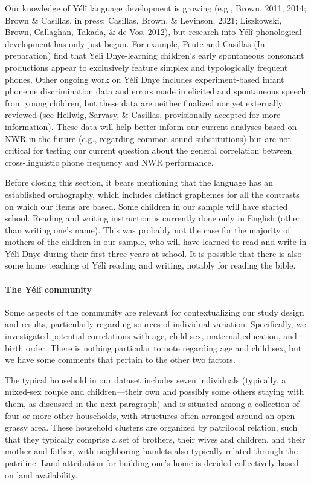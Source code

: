 \documentclass[
  american,
  ,man,floatsintext]{apa6}
\let\oldparagraph\paragraph
\renewcommand{\paragraph}[1]{\oldparagraph{#1}\mbox{}}
\begin{document}
Our knowledge of Yélî language development is growing (e.g., Brown, 2011, 2014; Brown \& Casillas, in press; Casillas, Brown, \& Levinson, 2021; Liszkowski, Brown, Callaghan, Takada, \& de Vos, 2012), but research into Yélî phonological development has only just begun. For example, Peute and Casillas (In preparation) find that Yélî Dnye-learning children's early spontaneous consonant productions appear to exclusively feature simplex and typologically frequent phones. Other ongoing work on Yélî Dnye includes experiment-based infant phoneme discrimination data and errors made in elicited and spontaneous speech from young children, but these data are neither finalized nor yet externally reviewed (see Hellwig, Sarvasy, \& Casillas, provisionally accepted for more information). These data will help better inform our current analyses based on NWR in the future (e.g., regarding common sound substitutions) but are not critical for testing our current question about the general correlation between cross-linguistic phone frequency and NWR performance.

Before closing this section, it bears mentioning that the language has an established orthography, which includes distinct graphemes for all the contrasts on which our items are based. Some children in our sample will have started school. Reading and writing instruction is currently done only in English (other than writing one's name). This was probably not the case for the majority of mothers of the children in our sample, who will have learned to read and write in Yélî Dnye during their first three years at school. It is possible that there is also some home teaching of Yélî reading and writing, notably for reading the bible.

\hypertarget{the-yuxe9luxee-community}{%
\paragraph{The Yélî community}\label{the-yuxe9luxee-community}}

Some aspects of the community are relevant for contextualizing our study design and results, particularly regarding sources of individual variation. Specifically, we investigated potential correlations with age, child sex, maternal education, and birth order. There is nothing particular to note regarding age and child sex, but we have some comments that pertain to the other two factors.

The typical household in our dataset includes seven individuals (typically, a mixed-sex couple and children---their own and possibly some others staying with them, as discussed in the next paragraph) and is situated among a collection of four or more other households, with structures often arranged around an open grassy area. These household clusters are organized by patrilocal relation, such that they typically comprise a set of brothers, their wives and children, and their mother and father, with neighboring hamlets also typically related through the patriline. Land attribution for building one's home is decided collectively based on land availability.
\end{document}
